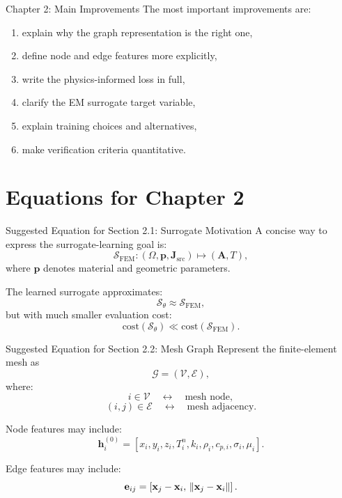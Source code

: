 \documentclass[aspectratio=169]{beamer}
\begin{document}
\begin{frame}{Chapter 2: Main Improvements}
The most important improvements are:
\begin{enumerate}
    \item explain why the graph representation is the right one,
    \item define node and edge features more explicitly,
    \item write the physics-informed loss in full,
    \item clarify the EM surrogate target variable,
    \item explain training choices and alternatives,
    \item make verification criteria quantitative.
\end{enumerate}
\end{frame}

\section{Equations for Chapter 2}

\begin{frame}{Suggested Equation for Section 2.1: Surrogate Motivation}
A concise way to express the surrogate-learning goal is:
\[
\mathcal{S}_{\mathrm{FEM}}:
(\Omega,\mathbf{p},\mathbf{J}_{\mathrm{src}})
\mapsto
(\mathbf{A},T),
\]
where \(\mathbf{p}\) denotes material and geometric parameters.

The learned surrogate approximates:
\[
\mathcal{S}_{\theta}
\approx
\mathcal{S}_{\mathrm{FEM}},
\]
but with much smaller evaluation cost:
\[
\mathrm{cost}(\mathcal{S}_{\theta})
\ll
\mathrm{cost}(\mathcal{S}_{\mathrm{FEM}}).
\]
\end{frame}

\begin{frame}{Suggested Equation for Section 2.2: Mesh Graph}
Represent the finite-element mesh as
\[
\mathcal{G}=(\mathcal{V},\mathcal{E}),
\]
where:
\[
i\in\mathcal{V}
\quad\leftrightarrow\quad
\text{mesh node},
\]
\[
(i,j)\in\mathcal{E}
\quad\leftrightarrow\quad
\text{mesh adjacency}.
\]

Node features may include:
\[
\mathbf{h}_i^{(0)}
=
\left[
x_i,y_i,z_i,T_i^n,k_i,\rho_i,c_{p,i},\sigma_i,\mu_i
\right].
\]

Edge features may include:
\[
\mathbf{e}_{ij}
=
\left[
\mathbf{x}_j-\mathbf{x}_i,\,
\norm{\mathbf{x}_j-\mathbf{x}_i}
\right].
\]
\end{frame}
\end{document}

